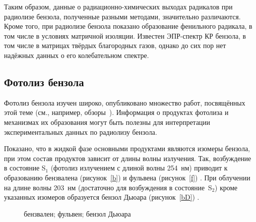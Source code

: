 {Таким образом, данные о радиационно-химических выходах радикалов при радиолизе бензола, полученные разными методами, значительно различаются. Кроме того, при радиолизе бензола показано образование  фенильного радикала, в том числе в условиях матричной изоляции. Известен ЭПР-спектр КР бензола, в том числе в матрицах твёрдых благородных газов, однако до сих пор нет надёжных данных о его колебательном спектре.

\subsection{Фотолиз бензола}
\label{photolysis}
Фотолиз бензола изучен широко, опубликовано множество работ, посвящённых этой теме (см., например, обзоры~\cite{Bryce-Smith1976, Bryce-Smith1977}). Информация о продуктах фотолиза и механизмах их образования могут быть полезны для интерпретации экспериментальных данных по радиолизу бензола. 

Показано, что в жидкой фазе основными продуктами являются изомеры бензола,
при этом состав продуктов зависит от длины волны излучения. Так, возбуждение в состояние S$_1$ (фотолиз излучением с длиной волны 254~нм) приводит к образованию 
бензвалена (рисунок~\ref{b}) и фульвена (рисунок~\ref{f}) \cite{Wilzbach1967, Wilzbach1968}. При облучении на длине волны 203~нм (достаточно для возбуждения в состояние~S$_2$) 
кроме указанных изомеров образуется бензол Дьюара (рисунок~\ref{bD}) \cite{Ward1968, Bryce-Smith1971}. \\

\begin{figure}[H]  
\vspace{-4ex} \centering {}  
\hspace{4ex}
\hspace{4ex}
\caption{ бензвален;  фульвен;  бензол Дьюара} \label{iso}
\end{figure}

}
